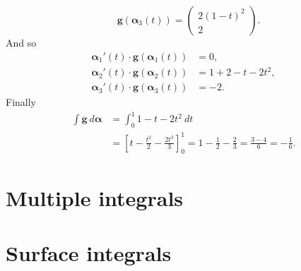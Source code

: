\begin{solution}
\[        \quad
        \mathbf{g}(\boldsymbol{\alpha}_3(t)) =
        \left(\begin{smallmatrix}
            2 {(1-t)}^2 \\ 2
        \end{smallmatrix}\right).
    \]
    And so
    \[
        \begin{aligned}
            \boldsymbol{\alpha}_1'(t) \cdot \mathbf{g}(\boldsymbol{\alpha}_1(t)) & = 0,               \\
            \boldsymbol{\alpha}_2'(t) \cdot \mathbf{g}(\boldsymbol{\alpha}_2(t)) & = 1 + 2 -t - 2t^2, \\
            \boldsymbol{\alpha}_3'(t) \cdot \mathbf{g}(\boldsymbol{\alpha}_3(t)) & = -2.
        \end{aligned}
    \]
    Finally
    \[
        \begin{aligned}
            \int \mathbf{g} \ d\boldsymbol\alpha
             & = \int_0^1 1  -t - 2t^2 \ dt                           \\
             & = {\left[t - \frac{t^2}{2} - \frac{2 t^3}{3}\right]}_0^1
            = 1 - \frac{1}{2} - \frac{2}{3}
            = \frac{3-4}{6} = - \frac{1}{6}.
        \end{aligned}
    \]
\end{solution}

\section{Multiple integrals}

\section{Surface integrals}